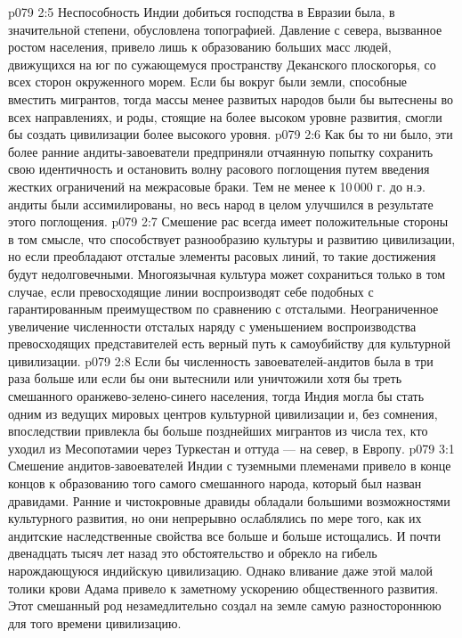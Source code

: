 \vs p079 2:5 Неспособность Индии добиться господства в Евразии была, в значительной степени, обусловлена топографией. Давление с севера, вызванное ростом населения, привело лишь к образованию больших масс людей, движущихся на юг по сужающемуся пространству Деканского плоскогорья, со всех сторон окруженного морем. Если бы вокруг были земли, способные вместить мигрантов, тогда массы менее развитых народов были бы вытеснены во всех направлениях, и роды, стоящие на более высоком уровне развития, смогли бы создать цивилизации более высокого уровня.
\vs p079 2:6 Как бы то ни было, эти более ранние андиты\hyp{}завоеватели предприняли отчаянную попытку сохранить свою идентичность и остановить волну расового поглощения путем введения жестких ограничений на межрасовые браки. Тем не менее к 10\,000 г. до н.э. андиты были ассимилированы, но весь народ в целом улучшился в результате этого поглощения.
\vs p079 2:7 \pc Смешение рас всегда имеет положительные стороны в том смысле, что способствует разнообразию культуры и развитию цивилизации, но если преобладают отсталые элементы расовых линий, то такие достижения будут недолговечными. Многоязычная культура может сохраниться только в том случае, если превосходящие линии воспроизводят себе подобных с гарантированным преимуществом по сравнению с отсталыми. Неограниченное увеличение численности отсталых наряду с уменьшением воспроизводства превосходящих представителей есть верный путь к самоубийству для культурной цивилизации.
\vs p079 2:8 Если бы численность завоевателей\hyp{}андитов была в три раза больше или если бы они вытеснили или уничтожили хотя бы треть смешанного оранжево\hyp{}зелено\hyp{}синего населения, тогда Индия могла бы стать одним из ведущих мировых центров культурной цивилизации и, без сомнения, впоследствии привлекла бы больше позднейших мигрантов из числа тех, кто уходил из Месопотамии через Туркестан и оттуда --- на север, в Европу.
\vs p079 3:1 Смешение андитов\hyp{}завоевателей Индии с туземными племенами привело в конце концов к образованию того самого смешанного народа, который был назван дравидами. Ранние и чистокровные дравиды обладали большими возможностями культурного развития, но они непрерывно ослаблялись по мере того, как их андитские наследственные свойства все больше и больше истощались. И почти двенадцать тысяч лет назад это обстоятельство и обрекло на гибель нарождающуюся индийскую цивилизацию. Однако вливание даже этой малой толики крови Адама привело к заметному ускорению общественного развития. Этот смешанный род незамедлительно создал на земле самую разностороннюю для того времени цивилизацию.
